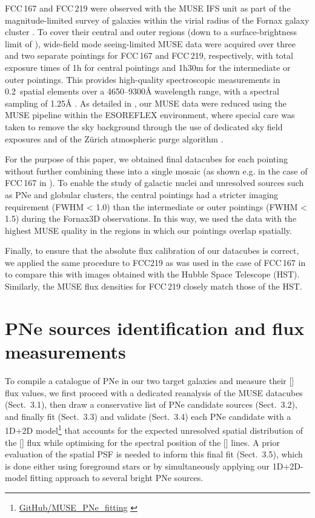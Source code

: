 \documentclass{aa}
\begin{document}
FCC\,167 and FCC\,219 were observed with the MUSE IFS unit \citep{bacon_muse_2010} as part of the magnitude-limited survey of galaxies within the virial radius of the Fornax galaxy cluster \citep[hereafter Fornax3D]{sarzi_fornax3d_2018}.
To cover their central and outer regions (down to a surface-brightness limit of ), wide-field mode seeing-limited MUSE data were acquired over three and two separate pointings for FCC\,167 and FCC\,219, respectively, with total exposure times of 1h for central pointings and 1h30m for the intermediate or outer pointings. This provides high-quality spectroscopic measurements in 0.2\arcsec\ spatial elements over a 4650--9300\AA{} wavelength range, with a spectral sampling of 1.25\AA{} .
As detailed in \citeauthor{sarzi_fornax3d_2018}, our MUSE data were reduced using the MUSE pipeline \citep{weilbacher_design_2012, weilbacher_muse-drp_2016} within the ESOREFLEX \citep{freudling_automated_2013} environment, where special care was taken to remove the sky background through the use of dedicated sky field exposures and of the Z\"urich atmospheric purge algorithm \citep{soto_zap_2016}.

For the purpose of this paper, we obtained final datacubes for each pointing without further combining these into a single mosaic (as shown e.g. in the case of FCC\,167 in \citealp{sarzi_fornax3d_2018}). To enable the study of galactic nuclei and unresolved sources such as PNe and globular clusters, the central pointings had a stricter imaging requirement (FWHM < 1.0\arcsec) than the intermediate or outer pointings (FWHM < 1.5\arcsec) during the Fornax3D observations. In this way, we used the data with the highest MUSE quality in the regions in which our pointings overlap spatially.

Finally, to ensure that the absolute flux calibration of our datacubes is correct, we applied the same procedure to FCC219 as was used in the case of FCC\,167 in \citet{sarzi_fornax3d_2018} to compare this with images obtained with the Hubble Space Telescope (HST). Similarly, the MUSE flux densities for FCC\,219 closely match those of the HST.


\section{PNe sources identification and flux measurements}

To compile a catalogue of PNe in our two target galaxies and measure their [] flux values, we first proceed with a dedicated reanalysis of the MUSE datacubes (Sect.~3.1), then draw a conservative list of PNe candidate sources (Sect.~3.2), and finally fit (Sect.~3.3) and validate (Sect.~3.4) each PNe candidate with a 1D+2D model\footnote{\href{https://github.com/tspriggs/MUSE_PNe_fitting}{GitHub/MUSE\_PNe\_fitting} \citep{spriggs_tspriggsmuse_pne_fitting_2020}} that accounts for the expected unresolved spatial distribution of the [] flux while optimising for the spectral position of the [] lines. A prior evaluation of the spatial PSF is needed to inform this final fit (Sect.~3.5), which is done either using foreground stars or by simultaneously applying our 1D+2D-model fitting approach to several bright PNe sources.
\end{document}
